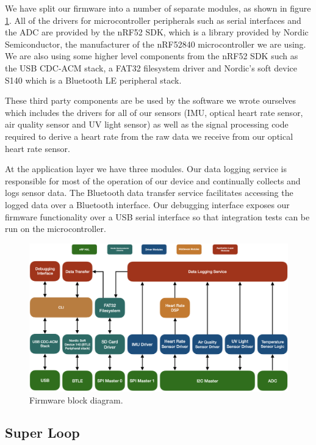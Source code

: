 We have split our firmware into a number of separate modules, as shown in figure
\ref{fig:fw_block_diag}. All of the drivers for microcontroller peripherals
such as serial interfaces and the ADC are provided by the nRF52 SDK, which is a
library provided by Nordic Semiconductor, the manufacturer of the nRF52840
microcontroller we are using. We are also using some higher level components
from the nRF52 SDK such as the USB CDC-ACM stack, a FAT32 filesystem driver and
Nordic's soft device S140 which is a Bluetooth LE peripheral stack.

These third party components are be used by the software we wrote ourselves
which includes the drivers for all of our sensors (IMU, optical heart rate
sensor, air quality sensor and UV light sensor) as well as the signal processing
code required to derive a heart rate from the raw data we receive from our
optical heart rate sensor.

At the application layer we have three modules. Our data logging service is
responsible for most of the operation of our device and continually collects
and logs sensor data. The Bluetooth data transfer service facilitates accessing
the logged data over a Bluetooth interface. Our debugging interface exposes our
firmware functionality over a USB serial interface so that integration tests can
be run on the microcontroller.

\begin{figure}[!htb]
\centering
\includegraphics[width=\textwidth]{images/fw_block_diag.png}
\caption{Firmware block diagram.}
\label{fig:fw_block_diag}
\end{figure}

\subsection{Super Loop}

